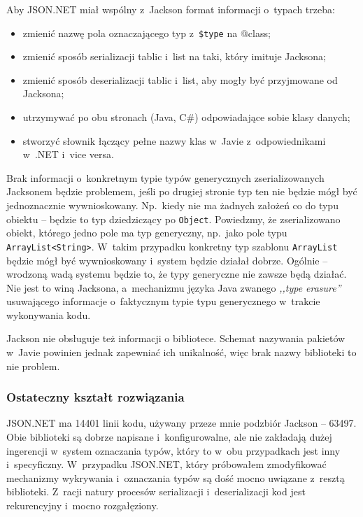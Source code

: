 Aby JSON.NET miał wspólny z~Jackson format informacji o~typach trzeba:
\begin{itemize}
	\item zmienić nazwę pola oznaczającego typ z~\texttt{\$type} na @class;
	\item zmienić sposób serializacji tablic i~list na taki, który imituje Jacksona;
	\item zmienić sposób deserializacji tablic i~list, aby mogły być przyjmowane od Jacksona;
	\item utrzymywać po obu stronach (Java, C\#) odpowiadające sobie klasy danych;
	\item stworzyć słownik łączący pełne nazwy klas w~Javie z~odpowiednikami w~.NET i~vice versa.
\end{itemize}

Brak informacji o~konkretnym typie typów generycznych zserializowanych Jacksonem będzie problemem, jeśli po drugiej stronie typ ten nie będzie mógł być jednoznacznie wywnioskowany. Np.\ kiedy nie ma żadnych założeń co do typu obiektu -- będzie to typ dziedziczący po \texttt{Object}.
Powiedzmy, że zserializowano obiekt, którego jedno pole ma typ generyczny, np.\ jako pole typu \texttt{ArrayList<String>}. W~takim przypadku konkretny typ szablonu \texttt{ArrayList} będzie mógł być wywnioskowany i~system będzie działał dobrze.
Ogólnie -- wrodzoną wadą systemu będzie to, że typy generyczne nie zawsze będą działać.
Nie jest to winą Jacksona, a~mechanizmu języka Java zwanego \emph{,,type erasure''} usuwającego informacje o~faktycznym typie typu generycznego w~trakcie wykonywania kodu.

Jackson nie obsługuje też informacji o bibliotece. Schemat nazywania pakietów w~Javie powinien jednak zapewniać ich unikalność, więc brak nazwy biblioteki to nie problem.

\subsubsection{Ostateczny kształt rozwiązania}
JSON.NET ma 14401 linii kodu, używany przeze mnie podzbiór Jackson -- 63497. Obie biblioteki są dobrze napisane i~konfigurowalne, ale nie zakładają dużej ingerencji w~system oznaczania typów, który to w~obu przypadkach jest inny i~specyficzny.
W~przypadku JSON.NET, który próbowałem zmodyfikować mechanizmy wykrywania i~oznaczania typów są dość mocno uwiązane z~resztą biblioteki. Z~racji natury procesów serializacji i~deserializacji kod jest rekurencyjny i~mocno rozgałęziony.

